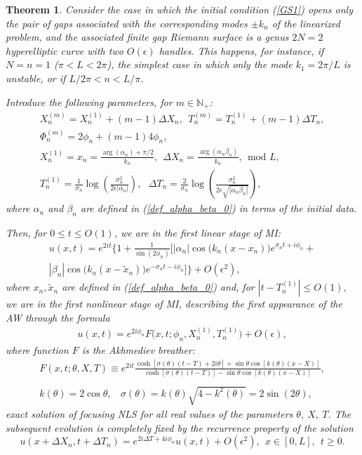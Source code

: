 \documentclass[12pt]{article}
\newcommand{\NN}{{\mathbb N}}
\newtheorem{theorem}{Theorem}
\newcommand{\beq}{\begin{equation}}
\newcommand{\eeq}{\end{equation}}
\newcommand{\ba}{\begin{array}}
\newcommand{\ea}{\end{array}}
\newcommand{\eps}{{\epsilon}}
\begin{document}
  \begin{theorem}

  Consider the case in which the initial condition (\ref{GS1}) opens only the pair of gaps associated with the corresponding modes $\pm k_n$ of the linearized problem, and the associated finite gap Riemann surface is a genus $2N=2$ hyperelliptic curve with two $O(\eps)$ handles. This happens, for instance, if $N=n=1$ ($\pi< L <2 \pi$), the simplest case in which only the mode $k_1=2\pi/L$ is unstable, or if $L/2\pi <n <L/\pi$. 

Introduce the following parameters, for $m\in \NN_+ $:
\beq\label{parameters_recurrence}
\ba{l}
X^{(m)}_n =X^{(1)}_n+(m-1)\Delta X_n, \ \ T^{(m)}_n=T^{(1)}_n+(m-1)\Delta T_n, \\ \Phi^{(m)}_n =2\phi_n+(m-1)4\phi_n , \\
X^{(1)}_n=x_n=\frac{\arg(\alpha_n)+\pi/2}{k_n}, \ \ \Delta X_n=\frac{\arg(\alpha_n\beta_n)}{k_n}, \ \ \mbox{mod }L, \\
T^{(1)}_n= \frac{1}{\sigma_n}\log\left(\frac{\sigma^2_n}{2 \eps |\alpha_n| } \right), \  \ \
\Delta T_n=\frac{2}{\sigma_n}\log\left( \frac{\sigma^2_n}{2\eps \sqrt{|\alpha_n\beta_n |}} \right),
\ea
\eeq
where $\alpha_n$ and $\beta_n$ are defined in (\ref{def_alpha_beta_0}) in terms of the initial data.

Then, for $0\le t\le O(1)$, we are in the first linear stage of MI:
\beq
\ba{l}
u(x,t)=e^{2it}\Big\{1+\frac{1}{\sin(2\phi_n)}\Big[|\alpha_n |\cos\Big(k_n  (x-x_n)\Big)e^{\sigma_n t+i\phi_n}+ \\
|\beta_n |\cos\Big(k_n (x-\tilde{x}_n)\Big)e^{-\sigma_n t-i\phi_n}  \Big] \Big\}+O(\eps^2),
\ea
\eeq
where $x_n,\tilde{x}_n$ are defined in (\ref{def_alpha_beta_0}) 
and, for $|t-T^{(1)}_n|\le O(1)$, we are in the first nonlinear stage of MI, describing the first appearance of the AW through the formula
\beq\label{AW_1st_appearance}
\ba{l}
u(x,t)=e^{2i\phi_n} F\Big(x,t;\phi_n,X^{(1)}_n,T^{(1)}_n \Big)+O(\eps), 
\ea
\eeq
where function $F$  is the Akhmediev breather:
\beq\label{Akhm1a}
\ba{l}
F(x,t;\theta,X,T)\equiv e^{2it}\frac{\cosh[\sigma(\theta) (t-T)+2i\theta ]+\sin\theta \cos[k(\theta)(x-X)]}{\cosh[\sigma(\theta) (t-T)]-\sin\theta \cos[k(\theta)(x-X)]}, \\
~ \\
k(\theta)=2\cos\theta, \ \ \ \ \sigma(\theta)=k(\theta)\sqrt{4-k^2(\theta)}=2\sin(2\theta),
\ea
\eeq
exact solution of focusing NLS for all real values of the parameters $\theta,~X,~T$. The subsequent evolution is completely fixed by the recurrence property of the solution
\beq\label{periodicity}
u(x+\Delta X_{n},t+\Delta T_{n})=e^{2i\Delta T+4i\phi_{n}}u(x,t)+O(\eps^2), \ \ x\in [0,L], \ \ t\ge 0.
\eeq
\end{theorem}
\end{document}
